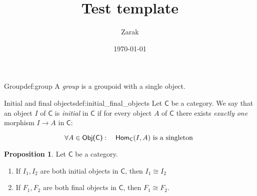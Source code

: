 \documentclass[a4paper]{article}
\title{Test template}
\author{Zarak}
\date{\today}
\newcommand{\cat}{%
  \textsf%
}
\theoremstyle{definition}
\newtheorem{proposition}{Proposition}
\begin{document}
\maketitle

\begin{definition}{Group}{def:group}
  A \textit{group} is a groupoid with a single object.
\end{definition}

\begin{definition}{Initial and final objects}{def:initial_final_objects}
  Let $\cat{C}$ be a category. We say that an object $I$ of $\cat{C}$ is
  \textit{initial} in $\cat{C}$ if for every object $A$ of $\cat{C}$ there exists
  \textit{exactly one} morphism $I \to  A$ in $\cat{C}$:

  \begin{equation*}
    \forall A \in \cat{Obj(C)} : \quad \cat{Hom}_\cat{C}(I, A) \text{ is
    a singleton }
  \end{equation*}
\end{definition}

\begin{proposition}
  Let $\cat{C}$ be a category.
  \begin{enumerate}
    \item If $ I_1, I_2$ are both initial objects in $\cat{C}$, then $ I_1
      \cong I_2$
    \item If $F_1, F_2$ are both final objects in $ \cat{C}$, then $ F_1 \cong
      F_2$.
  \end{enumerate}
\end{proposition}
\end{document}
